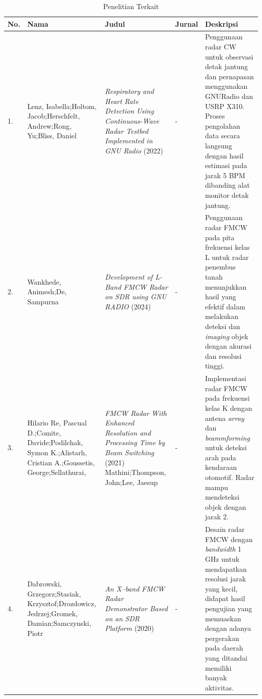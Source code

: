 \begin{center}
	\begin{longtable}{|p{0.5cm}|p{2cm}|p{3cm}|p{2cm}|p{4cm}|}
	\caption{Penelitian Terkait}
	\label{tab:PenelitianDulu}\\
	\hline
	\textbf{No.} & \textbf{Nama} & \textbf{Judul} &\textbf{Jurnal} & \textbf{Deskripsi}\\
	\hline
	1.& Lenz, Isabella;\newline Holtom, Jacob;\newline Herschfelt, Andrew;\newline Rong, Yu;\newline Bliss, Daniel 
	& \textit{Respiratory and Heart Rate Detection Using Continuous-Wave Radar Testbed Implemented in GNU Radio } (2022)
	& -
	& Penggunaan radar CW untuk observasi detak jantung dan pernapasan menggunakan GNURadio dan USRP X310. Proses pengolahan data secara langsung dengan hasil estimasi pada jarak 5 BPM dibanding alat monitor detak jantung. 
	\\ \hline
	
	2. 	& Wankhede, Animesh;\newline De, Sampurna
	& \textit{Development of L-Band FMCW Radar on SDR using GNU RADIO} (2024)
	& - 
	& Penggunaan radar FMCW pada pita frekuensi kelas L untuk radar penembus tanah menunjukkan hasil yang efektif dalam melakukan deteksi dan \textit{imaging} objek dengan akurasi dan resolusi tinggi. \\ \hline
	
	3. & Hilario Re, Pascual D.;\newline Comite, Davide;\newline Podilchak, Symon K.;\newline Alistarh, Cristian A.;\newline Goussetis, George;\newline Sellathurai, 
	& \textit{FMCW Radar With Enhanced Resolution and Processing Time by Beam Switching} (2021)
	Mathini;\newline Thompson, John;\newline Lee, Jaesup
	& -
	& Implementasi radar FMCW pada frekuensi kelas K dengan antena \textit{array} dan \textit{beammforming} untuk deteksi arah pada kendaraan otomotif. Radar mampu mendeteksi objek dengan jarak 2\textdegree.
	\\ \hline
	
	4.& Dabrowski, Grzegorz;\newline Stasiak, Krzysztof;\newline Drozdowicz, Jedrzej;\newline Gromek, Damian;\newline Samczynski, Piotr
	& \textit{An X–band FMCW Radar Demonstrator Based on an SDR Platform} (2020)
	& -
	& Desain radar FMCW dengan \textit{bandwidth} 1 GHz untuk mendapatkan resolusi jarak yang kecil, didapat hasil pengujian yang memuaskan dengan adanya pergerakan pada daerah yang ditandai memiliki banyak aktivitas. \\ \hline
	

\end{longtable}
\end{center}
